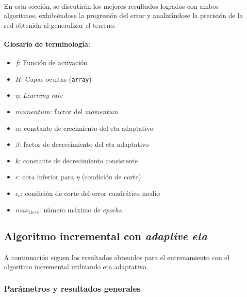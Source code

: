 \documentclass[12pt, twocolumn]{article}
\begin{document}
	\paragraph{} En esta sección, se discutirán los mejores resultados logrados con ambos algoritmos, exhibiéndose la progresión del error y analizándose la precisión de la red obtenida al generalizar el terreno.
	
	\paragraph{Glosario de terminología:}
	
	\begin{itemize}
		\item $f$: Función de activación
		\item $H$: Capas ocultas (\verb|array|)
		\item $\eta$: \textit{Learning rate}
		\item $momentum$: factor del \textit{momentum}
		\item $\alpha$: constante de crecimiento del eta adaptativo
		\item $\beta$: factor de decrecimiento del eta adaptativo
		\item $k$: constante de decrecimiento consistente
		\item $\epsilon$: cota inferior para $\eta$ (condición de corte)
		\item $\epsilon_{e}$: condición de corte del error cuadrático medio
		\item $max_{iters}$: número máximo de \textit{epochs}.
		
	\end{itemize}
	
	\subsection{Algoritmo incremental con \textit{adaptive eta}}
	
	\paragraph{} A continuación siguen los resultados obtenidos para el entrenamiento con el algoritmo incremental utilizando eta adaptativo.  
	
	\subsubsection{Parámetros y resultados generales} 
	
\end{document}
